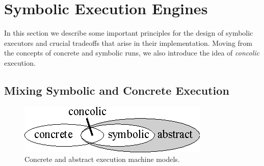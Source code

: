 
\section{Symbolic Execution Engines}
\label{se:executors}

In this section we describe some important principles for the design of symbolic executors and crucial tradeoffs that arise in their implementation. Moving from the concepts of concrete and symbolic runs, we also introduce the idea of {\em concolic} execution.

\subsection{Mixing Symbolic and Concrete Execution}
\label{ss:concrete-concolic-symbolic}

\begin{figure}[t]
\centering
\vspace{-0.75mm}
\includegraphics[width=0.34\columnwidth]{images/concrete-abstract.eps} 
\caption{Concrete and abstract execution machine models.}
\label{fig:concrete-symbolic}
\vspace{-1.5mm}
\end{figure}

